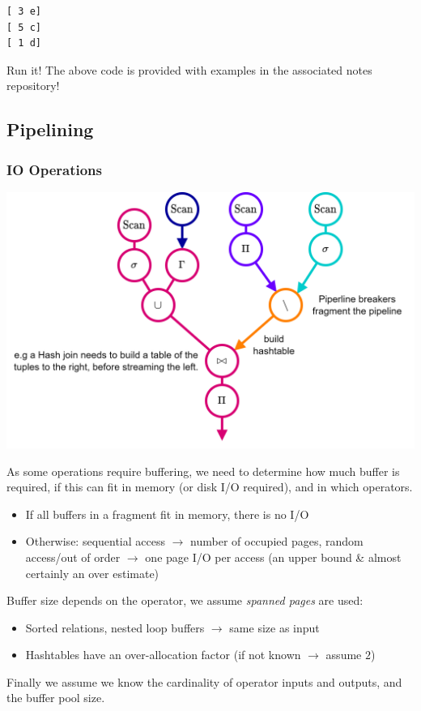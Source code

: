 \begin{verbatim}
[ 3 e]
[ 5 c]
[ 1 d]
\end{verbatim}

\begin{sidenotebox}{Run it!}
  The above code is provided with examples in the associated notes repository!
\end{sidenotebox}

\subsection{Pipelining}
\subsubsection{IO Operations}
\begin{center}
  \includegraphics[width=.7\textwidth]{processing_models/images/pipeline_fragments.drawio.png}
\end{center}
As some operations require buffering, we need to determine how much buffer is required, if this can fit in memory (or disk I/O required), and in which operators.
\begin{itemize}
  \item If all buffers in a fragment fit in memory, there is no I/O
  \item Otherwise: sequential access $\to$ number of occupied pages, random access/out of order $\to$ one page I/O per access (an upper bound \& almost certainly an over estimate)
\end{itemize}
Buffer size depends on the operator, we assume \textit{spanned pages} are used:
\begin{itemize}
  \item Sorted relations, nested loop buffers $\to$ same size as input
  \item Hashtables have an over-allocation factor (if not known $\to$ assume $2$)
\end{itemize}
Finally we assume we know the cardinality of operator inputs and outputs, and the buffer pool size.


